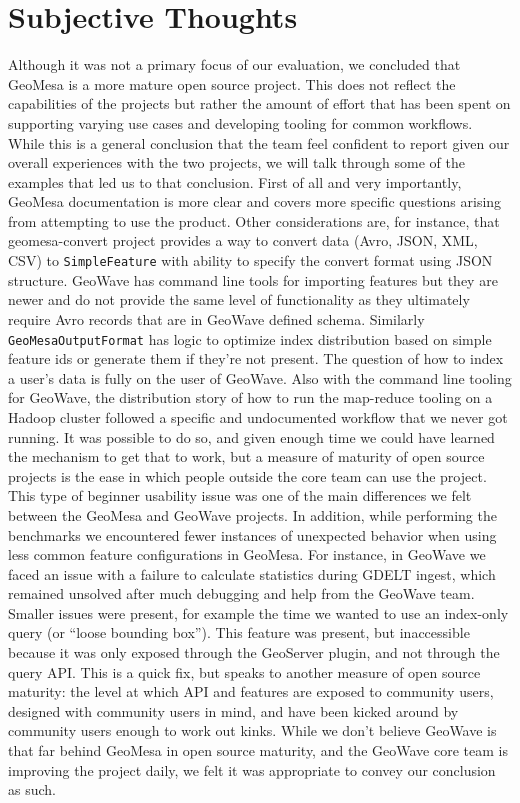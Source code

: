 \section{Subjective Thoughts}
\label{sec:subjective}

Although it was not a primary focus of our evaluation, we concluded that GeoMesa is a more mature open source project.
This does not reflect the capabilities of the projects but rather the amount of effort that has been spent on supporting varying use cases and developing tooling for common workflows.
While this is a general conclusion that the team feel confident to report given our overall experiences with the two projects, we will talk through some of the examples that led us to that conclusion.
First of all and very importantly, GeoMesa documentation is more clear and covers more specific questions arising from attempting to use the product.
Other considerations are, for instance, that geomesa-convert project provides a way to convert data (Avro, JSON, XML, CSV) to \texttt{SimpleFeature} with ability to specify the convert format using JSON structure.
GeoWave has command line tools for importing features but they are newer and do not provide the same level of functionality as they ultimately require Avro records that are in GeoWave defined schema.
Similarly \texttt{GeoMesaOutputFormat} has logic to optimize index distribution based on simple feature ids or generate them if they're not present.
The question of how to index a user’s data is fully on the user of GeoWave.
Also with the command line tooling for GeoWave, the distribution story of how to run the map-reduce tooling on a Hadoop cluster followed a specific and undocumented workflow that we never got running.
It was possible to do so, and given enough time we could have learned the mechanism to get that to work, but a measure of maturity of open source projects is the ease in which people outside the core team can use the project.
This type of beginner usability issue was one of the main differences we felt between the GeoMesa and GeoWave projects.
In addition, while performing the benchmarks we encountered fewer instances of unexpected behavior when using less common feature configurations in GeoMesa.
For instance, in GeoWave we faced an issue with a failure to calculate statistics during GDELT ingest, which remained unsolved after much debugging and help from the GeoWave team.
Smaller issues were present, for example the time we wanted to use an index-only query (or “loose bounding box”).
This feature was present, but inaccessible because it was only exposed through the GeoServer plugin, and not through the query API.
This is a quick fix, but speaks to another measure of open source maturity: the level at which API and features are exposed to community users, designed with community users in mind, and have been kicked around by community users enough to work out kinks.
While we don’t believe GeoWave is that far behind GeoMesa in open source maturity, and the GeoWave core team is improving the project daily, we felt it was appropriate to convey our conclusion as such.

